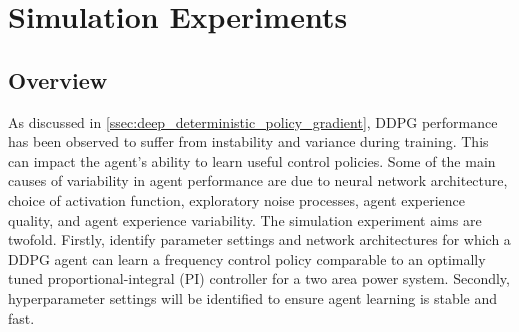 \section{Simulation Experiments}\label{sec:simulation_experiments}
\subsection{Overview}
As discussed in \textsection \ref{ssec:deep_deterministic_policy_gradient}, DDPG performance has been observed to suffer from instability and variance during training. This can impact the agent's ability to learn useful control policies. Some of the main causes of variability in agent performance are due to neural network architecture, choice of activation function, exploratory noise processes, agent experience quality, and agent experience variability. The simulation experiment aims are twofold. Firstly, identify parameter settings and network architectures for which a DDPG agent can learn a frequency control policy comparable to an optimally tuned proportional-integral (PI) controller for a two area power system. Secondly, hyperparameter settings will be identified to ensure agent learning is stable and fast.

